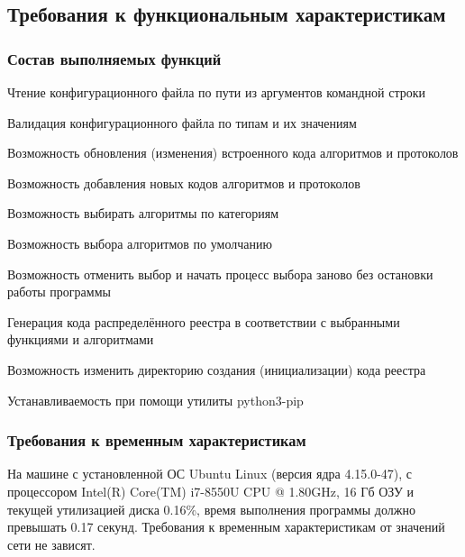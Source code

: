 \subsection{Требования к функциональным характеристикам}

\subsubsection{Состав выполняемых функций}
\begin{my_enumerate}
\item Чтение конфигурационного файла по пути из аргументов командной строки
\item Валидация конфигурационного файла по типам и их значениям
\item Возможность обновления (изменения) встроенного кода алгоритмов и протоколов
\item Возможность добавления новых кодов алгоритмов и протоколов
\item Возможность выбирать алгоритмы по категориям
\item Возможность выбора алгоритмов по умолчанию
\item Возможность отменить выбор и начать процесс выбора заново без остановки
      работы программы
\item Генерация кода распределённого реестра в соответствии с выбранными
      функциями и алгоритмами
\item Возможность изменить директорию создания (инициализации) кода реестра
\item Устанавливаемость при помощи утилиты python3-pip
\end{my_enumerate}

\subsubsection{Требования к временным характеристикам}
На машине с установленной ОС Ubuntu Linux (версия ядра 4.15.0-47), с
процессором Intel(R) Core(TM) i7-8550U CPU @ 1.80GHz, 16 Гб ОЗУ  и текущей
утилизацией диска 0.16\%, время выполнения программы должно превышать 0.17
секунд. Требования к временным характеристикам от значений сети не зависят.

